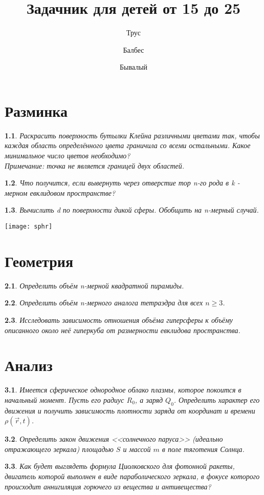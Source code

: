\documentclass[a4paper]{book}
\author{Трус \and Балбес \and Бывалый}
\title{Задачник для детей от 15 до 25}
\theoremstyle{problemstyle}
\newtheorem{problem}{} %
\begin{document}
    \maketitle
    \tableofcontents
    \chapter{Разминка}
    \begin{problem}
        Раскрасить поверхность бутылки Клейна различными цветами так, чтобы каждая область определённого цвета
        граничила со всеми остальными. Какое минимальное число цветов необходимо?\\
        \textit{Примечание: точка не является границей двух областей.}
    \end{problem}   
    \begin{problem}
        Что получится, если вывернуть через отверстие тор n-го рода в k - мерном евклидовом пространстве?
    \end{problem} 
    \begin{problem}
        Вычислить \int {} d по поверхности дикой сферы. Обобщить на n-мерный случай.
    \end{problem} 
    \texttt{[image: sphr]}
    \chapter{Геометрия}
    \begin{problem}
        Определить объём n-мерной квадратной пирамиды.
    \end{problem}    
    \begin{problem}
        Определить объём n-мерного аналога тетраэдра для всех \( n \ge 3 \).
    \end{problem}
    \begin{problem}
        Исследовать зависимость отношения объёма гиперсферы к объёму описанного
        около неё гиперкуба от размерности евклидова пространства.
    \end{problem}
    \chapter{Анализ}
    \begin{problem}
        Имеется сферическое однородное облако плазмы, которое покоится в
        начальный момент. Пусть его радиус \( R_0 \), а заряд \( Q_0 \).
        Определить характер его движения и получить зависимость плотности заряда
        от координат и времени \( \rho(\vec{r}, t) \).
    \end{problem}
    \begin{problem}
        Определить закон движения <<солнечного паруса>> (идеально отражающего
        зеркала) площадью \( S \) и массой \(m\) в поле тяготения Солнца.
    \end{problem}
    \begin{problem}
        Как будет выглядеть формула Циолковского для фотонной ракеты, двигатель
        которой выполнен в виде параболического зеркала, в фокусе которого
        происходит аннигиляция горючего из вещества и антивещества?
    \end{problem}
\end{document}

